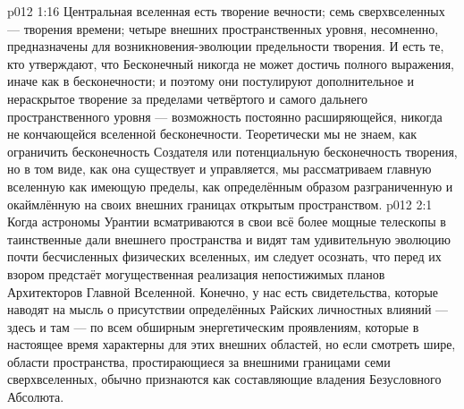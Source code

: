 \vs p012 1:16 Центральная вселенная есть творение вечности; семь сверхвселенных --- творения времени; четыре внешних пространственных уровня, несомненно, предназначены для возникновения\hyp{}эволюции предельности творения. И есть те, кто утверждают, что Бесконечный никогда не может достичь полного выражения, иначе как в бесконечности; и поэтому они постулируют дополнительное и нераскрытое творение за пределами четвёртого и самого дальнего пространственного уровня --- возможность постоянно расширяющейся, никогда не кончающейся вселенной бесконечности. Теоретически мы не знаем, как ограничить бесконечность Создателя или потенциальную бесконечность творения, но в том виде, как она существует и управляется, мы рассматриваем главную вселенную как имеющую пределы, как определённым образом разграниченную и окаймлённую на своих внешних границах открытым пространством.
\vs p012 2:1 Когда астрономы Урантии всматриваются в свои всё более мощные телескопы в таинственные дали внешнего пространства и видят там удивительную эволюцию почти бесчисленных физических вселенных, им следует осознать, что перед их взором предстаёт могущественная реализация непостижимых планов Архитекторов Главной Вселенной. Конечно, у нас есть свидетельства, которые наводят на мысль о присутствии определённых Райских личностных влияний --- здесь и там --- по всем обширным энергетическим проявлениям, которые в настоящее время характерны для этих внешних областей, но если смотреть шире, области пространства, простирающиеся за внешними границами семи сверхвселенных, обычно признаются как составляющие владения Безусловного Абсолюта.
